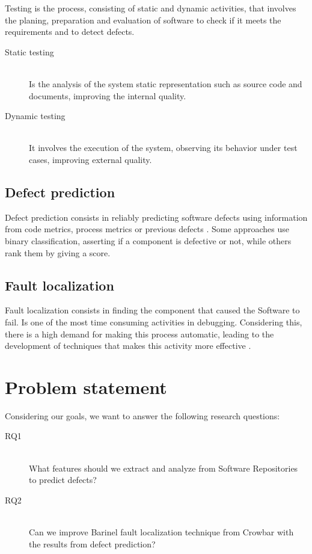 Testing is the process, consisting of static and dynamic activities, that
involves the planing, preparation and evaluation of software to check if
it meets the requirements and to detect defects.

\begin{description}
\item[Static testing] \hfill \\
Is the analysis of the system static representation such as source code and
documents, improving the internal quality.

\item[Dynamic testing] \hfill \\
It involves the execution of the system, observing its behavior under test
cases, improving external quality.
\end{description}

\subsection{Defect prediction}
Defect prediction consists in reliably predicting software defects using
information from code metrics, process metrics or previous
defects \cite{D'Ambros:2012:EDP:2318097.2318149}. Some approaches use
binary classification, asserting if a component is defective or not,
while others rank them by giving a score.

\subsection{Fault localization}
Fault localization consists in finding the component that caused the Software
to fail. Is one of the most time consuming activities in debugging. Considering
this, there is a high demand for making this process automatic, leading to the
development of techniques that makes this activity more effective
\cite{Wong09asurvey}.

\section{Problem statement}
Considering our goals, we want to answer the following research questions:

\begin{description}
\item[RQ1] \hfill \\
What features should we extract and analyze from Software Repositories to
predict defects?

\item[RQ2] \hfill \\
Can we improve Barinel fault localization technique from Crowbar with the
 results from defect prediction?
\end{description}

